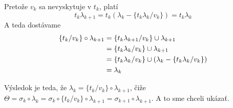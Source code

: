 \begin{dokaz}
\begin{itemize}
        Pretože $v_k$ sa nevyskytuje v $t_k$, platí
        \begin{equation*}
            t_k \lambda_{k+1} = t_k (\lambda_k - \{t_k\lambda_k / v_k\}) 
            =t_k \lambda_k
        \end{equation*}
        A teda dostávame
        \begin{equation*}
        \begin{split}
            \{ t_k / v_k\} \circ \lambda_{k+1} &= 
            \{t_k \lambda_{k+1}/v_k \} \cup \lambda_{k+1} \\
            & = \{t_k \lambda_k/v_k \} \cup \lambda_{k+1} \\
            & = \{t_k \lambda_k/v_k\} \cup 
                ( \lambda_k - \{ t_k\lambda_k/v_k\}) \\ 
            &= \lambda_k
        \end{split}
        \end{equation*}

        Výsledok je teda, že 
        $\lambda_{k} = \{ t_k / v_k \} \circ \lambda_{k+1}$,
        čiže $\Theta = \sigma_k \circ \lambda_k
            = \sigma_k \circ \{t_k/v_k\} \circ \lambda_{k+1}
            = \sigma_{k+1} \circ \lambda_{k+1}$. A to sme chceli
            ukázať.
    \end{itemize}
\end{dokaz}
